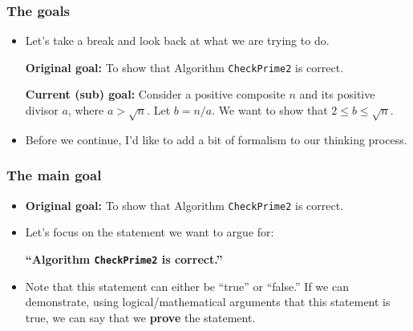 \documentclass{beamer}
\begin{document}
\begin{frame}\frametitle{The goals}
  \begin{itemize}
  \item Let's take a break and look back at what we are trying to do.
    \pause

    \begin{tcolorbox}
      {\bf Original goal:} To show that Algorithm {\tt CheckPrime2} is
      correct.
    \end{tcolorbox}
    \pause
    
    \begin{tcolorbox}
      {\bf Current (sub) goal:} Consider a positive composite $n$ and
      its positive divisor $a$, where $a>\sqrt{n}$.  Let $b=n/a$.  We
      want to show that $2\leq b\leq\sqrt{n}$.
    \end{tcolorbox}
    \pause

  \item Before we continue, I'd like to add a bit of formalism to our
    thinking process.
  \end{itemize}
\end{frame}

\begin{frame}\frametitle{The main goal}
  \begin{itemize}
  \item {\bf Original goal:} To show that Algorithm {\tt CheckPrime2}
    is correct.  \pause
  \item Let's focus on the statement we want to argue for:
    
    \begin{tcolorbox}
      {\bf ``Algorithm {\tt CheckPrime2} is correct.''}
    \end{tcolorbox}

    \pause
  \item
    Note that this statement can either be ``true'' or ``false.''  If
    we can demonstrate, using logical/mathematical arguments that this
    statement is true, we can say that we {\bf prove} the statement.
  \end{itemize}
\end{frame}
\end{document}
